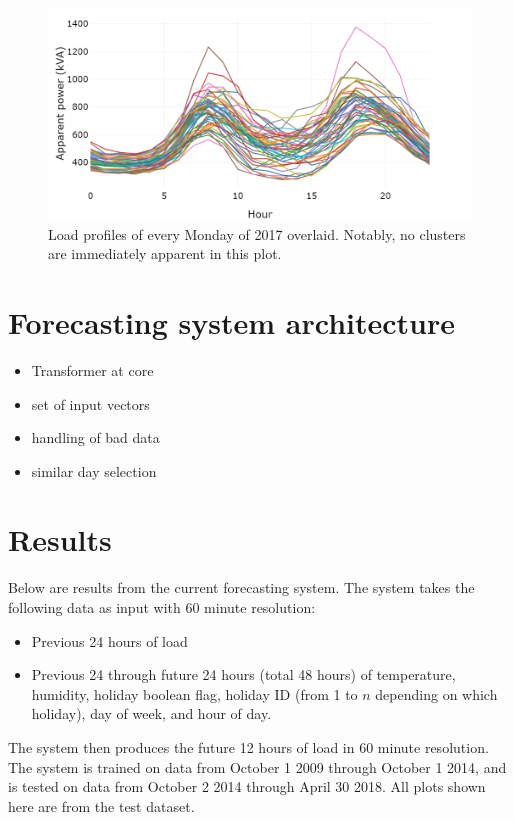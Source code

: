 \begin{figure}
	\centering
	\includegraphics[width=0.8\linewidth]{images/all-monday-profiles}
	\caption{Load profiles of every Monday of 2017 overlaid. Notably, no clusters are immediately apparent in this plot.}
	\label{fig:all-monday-profiles}
\end{figure}


\section{Forecasting system architecture}
\begin{itemize}
	\item Transformer at core
	\item set of input vectors
	\item handling of bad data
	\item similar day selection
\end{itemize}


\section{Results}
\label{bruny-results}
Below are results from the current forecasting system.
The system takes the following data as input with 60 minute resolution:
\begin{itemize}
	\item Previous 24 hours of load
	\item Previous 24 through future 24 hours (total 48 hours) of temperature, humidity, holiday boolean flag, holiday ID (from 1 to $n$ depending on which holiday), day of week, and hour of day.
\end{itemize}

The system then produces the future 12 hours of load in 60 minute resolution.
The system is trained on data from October 1 2009 through October 1 2014, and is tested on data from October 2 2014 through April 30 2018.
All plots shown here are from the test dataset.


